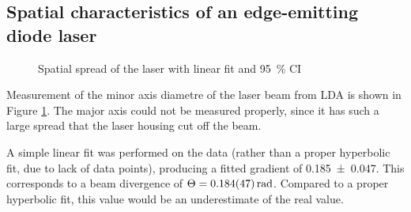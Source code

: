 \documentclass[a4paper]{scrartcl}
\begin{document}
\subsection{Spatial characteristics of an edge-emitting diode laser}
\begin{figure}
    \centering
    \caption{Spatial spread of the laser with linear fit and \SI{95}{\percent} CI}
    \label{fig:3.2}
\end{figure}

Measurement of the minor axis diametre of the laser beam from LDA is shown in Figure \ref{fig:3.2}. The major axis could not be measured properly, since it has such a large spread that the laser housing cut off the beam.

A simple linear fit was performed on the data (rather than a proper hyperbolic fit, due to lack of data points), producing a fitted gradient of \SI{0.185 \pm 0.047}{}. This corresponds to a beam divergence of \(\Theta = \SI{0.184 \pm 0.047}{\radian}\). Compared to a proper hyperbolic fit, this value would be an underestimate of the real value.
\end{document}
